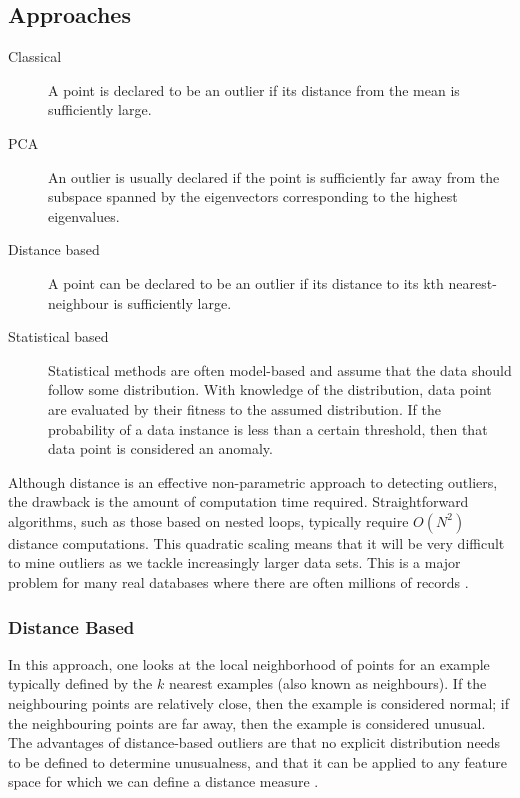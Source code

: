 \subsection{Approaches}
\label{anomalyDetection:approaches}
\begin{description}

\item[Classical] A point is declared to be an outlier if its distance from the
mean is sufficiently large.

\item[\gls{PCA}] An outlier is usually declared if the point is sufficiently far
away from the subspace spanned by the eigenvectors corresponding to the highest
eigenvalues.

\item[Distance based] A point can be declared to be an outlier if its distance
to its kth nearest-neighbour is sufficiently large.

\item[Statistical based] Statistical methods are often model-based and assume
that the data should follow some distribution. With knowledge of the
distribution, data point are evaluated by their fitness to the assumed
distribution. If the probability of a data instance is less than a certain
threshold, then that data point is considered an anomaly.

\end{description}

Although distance is an effective non-parametric approach to detecting outliers,
the drawback is the amount of computation time required. Straightforward 
algorithms, such as those based on nested loops, typically require $O(N^{2})$
distance computations. This quadratic scaling means that it will be very
difficult to mine outliers as we tackle increasingly larger data sets. This is a
major problem for many real databases where there are often millions of records
\cite{Bay:2003}.

\subsubsection{Distance Based}
\label{anomalyDetection:approaches:distance}
In this approach, one looks at the local neighborhood of points for an example
typically defined by the $k$ nearest examples (also known as neighbours). If the
neighbouring points are relatively close, then the example is considered normal;
if the neighbouring points are far away, then the example is considered unusual.
The advantages of distance-based outliers are that no explicit distribution
needs to be defined to determine unusualness, and that it can be applied to any
feature space for which we can define a distance measure \cite{Bay:2003}.

